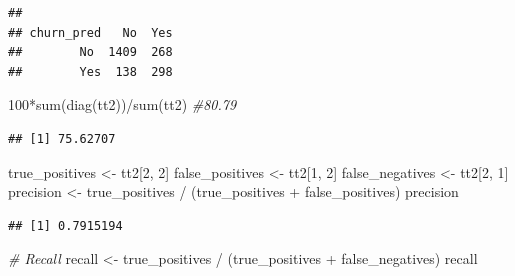 \documentclass[
  twoside]{article}
\newenvironment{Shaded}{\begin{snugshade}}{\end{snugshade}}
\newcommand{\CommentTok}[1]{\textcolor[rgb]{0.56,0.35,0.01}{\textit{#1}}}
\newcommand{\DecValTok}[1]{\textcolor[rgb]{0.00,0.00,0.81}{#1}}
\newcommand{\FunctionTok}[1]{\textcolor[rgb]{0.00,0.00,0.00}{#1}}
\newcommand{\NormalTok}[1]{#1}
\newcommand{\OtherTok}[1]{\textcolor[rgb]{0.56,0.35,0.01}{#1}}
\newcommand{\SpecialCharTok}[1]{\textcolor[rgb]{0.00,0.00,0.00}{#1}}
\begin{document}
\begin{Shaded}
\end{Shaded}

\begin{verbatim}
##           
## churn_pred   No  Yes
##        No  1409  268
##        Yes  138  298
\end{verbatim}

\begin{Shaded}
\begin{Highlighting}[]
\DecValTok{100}\SpecialCharTok{*}\FunctionTok{sum}\NormalTok{(}\FunctionTok{diag}\NormalTok{(tt2))}\SpecialCharTok{/}\FunctionTok{sum}\NormalTok{(tt2) }\CommentTok{\#80.79}
\end{Highlighting}
\end{Shaded}

\begin{verbatim}
## [1] 75.62707
\end{verbatim}

\begin{Shaded}
\begin{Highlighting}[]
\NormalTok{true\_positives }\OtherTok{\textless{}{-}}\NormalTok{ tt2[}\DecValTok{2}\NormalTok{, }\DecValTok{2}\NormalTok{]}
\NormalTok{false\_positives }\OtherTok{\textless{}{-}}\NormalTok{ tt2[}\DecValTok{1}\NormalTok{, }\DecValTok{2}\NormalTok{]}
\NormalTok{false\_negatives }\OtherTok{\textless{}{-}}\NormalTok{ tt2[}\DecValTok{2}\NormalTok{, }\DecValTok{1}\NormalTok{]}
\NormalTok{precision }\OtherTok{\textless{}{-}}\NormalTok{ true\_positives }\SpecialCharTok{/}\NormalTok{ (true\_positives }\SpecialCharTok{+}\NormalTok{ false\_positives)}
\NormalTok{precision}
\end{Highlighting}
\end{Shaded}

\begin{verbatim}
## [1] 0.7915194
\end{verbatim}

\begin{Shaded}
\begin{Highlighting}[]
\CommentTok{\# Recall}
\NormalTok{recall }\OtherTok{\textless{}{-}}\NormalTok{ true\_positives }\SpecialCharTok{/}\NormalTok{ (true\_positives }\SpecialCharTok{+}\NormalTok{ false\_negatives)}
\NormalTok{recall}
\end{Highlighting}
\end{Shaded}
\end{document}
